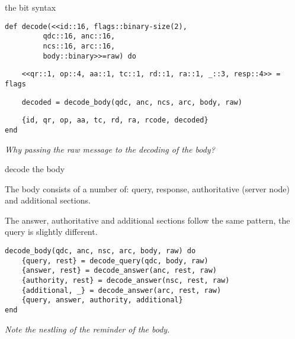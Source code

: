 \begin{frame}[fragile]{the bit syntax}

\begin{verbatim}
def decode(<<id::16, flags::binary-size(2), 
         qdc::16, anc::16, 
         ncs::16, arc::16, 
         body::binary>>=raw) do
\end{verbatim}

\pause
\begin{verbatim}
    <<qr::1, op::4, aa::1, tc::1, rd::1, ra::1, _::3, resp::4>> = flags
\end{verbatim}
\pause
\begin{verbatim}
    decoded = decode_body(qdc, anc, ncs, arc, body, raw)
\end{verbatim}
\pause
\begin{verbatim}
    {id, qr, op, aa, tc, rd, ra, rcode, decoded}
end
\end{verbatim}


{\em Why passing the raw message to the decoding of the body?}


\end{frame}

\begin{frame}[fragile]{decode the body}

The body consists of a number of: query, response, authoritative (server node) and additional sections.

\vspace{10pt}\pause

The answer, authoritative and additional sections follow the same pattern,
the query is slightly different.

\begin{verbatim}
decode_body(qdc, anc, nsc, arc, body, raw) do
    {query, rest} = decode_query(qdc, body, raw)
    {answer, rest} = decode_answer(anc, rest, raw)
    {authority, rest} = decode_answer(nsc, rest, raw)
    {additional, _} = decode_answer(arc, rest, raw)
    {query, answer, authority, additional}
end
\end{verbatim}

\vspace{10pt}\pause

{\em Note the nestling of the reminder of the body.}

\end{frame}

